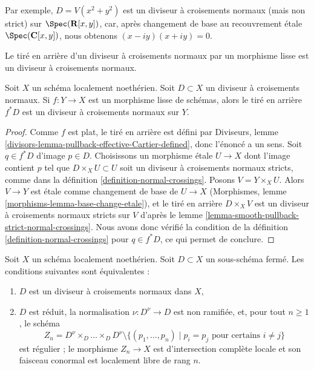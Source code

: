 \noindent
Par exemple, $D = V(x^2 + y^2)$ est un diviseur à croisements normaux
(mais non strict) sur
$\Spec(\mathbf{R}[x, y])$, car, après changement de base au
recouvrement \'etale $\Spec(\mathbf{C}[x, y])$, nous obtenons $(x - iy)(x + iy) = 0$.

\begin{lemma}
\label{lemma-smooth-pullback-normal-crossings}
\begin{slogan}
Le tiré en arrière d'un diviseur à croisements normaux par un morphisme
lisse est un diviseur à croisements normaux.
\end{slogan}
Soit $X$ un schéma localement noethérien. Soit $D \subset X$ un
diviseur à croisements normaux. Si $f : Y \to X$ est un morphisme
lisse de schémas, alors le tiré en arrière $f^*D$ est un
diviseur à croisements normaux sur $Y$.
\end{lemma}

\begin{proof}
Comme $f$ est plat, le tiré en arrière est défini par
Diviseurs, lemme \ref{divisors-lemma-pullback-effective-Cartier-defined},
donc l'énoncé a un sens.
Soit $q \in f^*D$ d'image $p \in D$.
Choisissons un morphisme \'etale $U \to X$ dont l'image contient $p$
tel que $D \times_X U \subset U$ soit un diviseur à croisements normaux
stricts, comme dans la définition \ref{definition-normal-crossings}.
Posons $V = Y \times_X U$. Alors $V \to Y$ est \'etale comme changement
de base de $U \to X$
(Morphismes, lemme \ref{morphisms-lemma-base-change-etale}),
et le tiré en arrière $D \times_X V$ est un diviseur à croisements normaux
stricts sur $V$ d'après le lemme \ref{lemma-smooth-pullback-strict-normal-crossings}.
Nous avons donc vérifié la condition de la
définition \ref{definition-normal-crossings}
pour $q \in f^*D$, ce qui permet de conclure.
\end{proof}

\begin{lemma}
\label{lemma-characterize-normal-crossings-normalization}
Soit $X$ un schéma localement noethérien. Soit $D \subset X$ un sous-schéma
fermé. Les conditions suivantes sont équivalentes :
\begin{enumerate}
\item $D$ est un diviseur à croisements normaux dans $X$,
\item $D$ est réduit, la normalisation $\nu : D^\nu \to D$ est non ramifiée,
et, pour tout $n \geq 1$, le schéma
$$
Z_n = D^\nu \times_D \ldots \times_D D^\nu
\setminus \{(p_1, \ldots, p_n) \mid p_i = p_j\text{ pour certains }i\not = j\}
$$
est régulier ; le morphisme $Z_n \to X$ est d'intersection complète locale
et son faisceau conormal est localement libre de rang $n$.
\end{enumerate}
\end{lemma}


